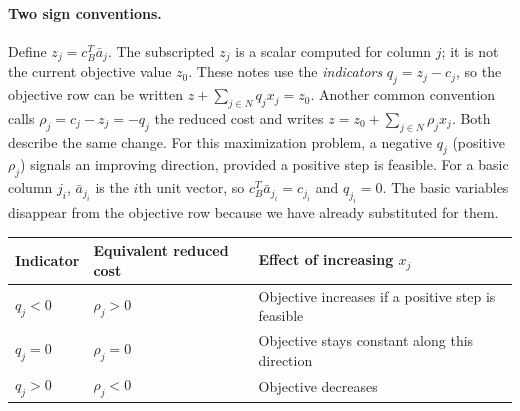 \documentclass[11pt,a4paper]{article}
\begin{document}
\paragraph{Two sign conventions.}
Define $z_j=c_B^T\bar a_j$. The subscripted $z_j$ is a scalar computed for
column $j$; it is not the current objective value $z_0$. These notes use
the \emph{indicators} $q_j=z_j-c_j$, so the objective row can be written
$z+\sum_{j\in N}q_jx_j=z_0$.
Another common convention calls $\rho_j=c_j-z_j=-q_j$ the reduced cost and
writes $z=z_0+\sum_{j\in N}\rho_jx_j$. Both describe the same change.
For this maximization problem, a negative $q_j$ (positive $\rho_j$)
signals an improving direction, provided a positive step is feasible.
For a basic column $j_i$, $\bar a_{j_i}$ is the $i$th unit vector, so
$c_B^T\bar a_{j_i}=c_{j_i}$ and $q_{j_i}=0$. The basic variables disappear
from the objective row because we have already substituted for them.
\begin{center}
  \begin{tabular}{lll}\toprule
    Indicator & Equivalent reduced cost & Effect of increasing $x_j$\\\midrule
    $q_j<0$ & $\rho_j>0$ & Objective increases if a positive step is feasible\\
    $q_j=0$ & $\rho_j=0$ & Objective stays constant along this direction\\
    $q_j>0$ & $\rho_j<0$ & Objective decreases\\\bottomrule
  \end{tabular}
\end{center}
\end{document}
